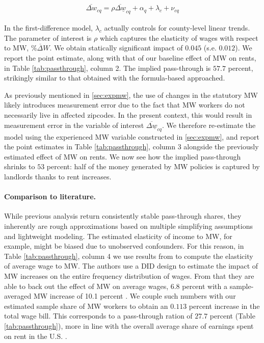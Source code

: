\begin{align}
	\overline{\Delta w}_{cq} = \rho \overline{\Delta \underline{w}}_{cq} + \alpha_{q} + \lambda_{c} + \nu_{cq}
\end{align}

In the first-difference model, $\lambda_{c}$ actually controls for county-level linear trends. 
The parameter of interest is $\rho$ which captures the elasticity of wages with respect to 
MW, $\overline{\% \Delta W}$. We obtain statically significant impact of $0.045$ (s.e. $0.012$). 
We report the point estimate, along with that of our baseline effect of MW on rents, in 
Table \ref{tab:passthrough}, column 2. The implied pass-through is $57.7$ percent, 
strikingly similar to that obtained with the formula-based approached. 

As previously mentioned in \autoref{sec:expmw}, the use of changes in the statutory 
MW likely introduces measurement error due to the fact that MW workers do not necessarily 
live in affected zipcodes. In the present context, this would result in measurement error in 
the variable of interest $\overline{\Delta \underline{w}}_{cq}$. We therefore re-estimate the model 
using the experienced MW variable constructed in \autoref{sec:expmw}, and report the point 
estimates in Table \ref{tab:passthrough}, column 3 alongside the previously estimated effect 
of MW on rents. We now see how the implied pass-through shrinks to $53$ percent: half of 
the money generated by MW policies is captured by landlords thanks to rent increases. \\

\paragraph{Comparison to literature.} While previous analysis return consistently stable 
pass-through shares, they inherently are rough approximations based on multiple simplifying 
assumptions and lightweight modeling. The estimated elasticity of income to MW, for example, 
might be biased due to unobserved confounders. For this reason, in Table \ref{tab:passthrough}, 
column 4 we use results from \textcite{cengiz2019effect} to compute the elasticity of 
average wage to MW. The authors use a DID design to estimate the impact of MW increases 
on the entire frequency distribution of wages. From that they are able to back out the effect of 
MW on average wages, 6.8 percent with a sample-averaged MW increase of 10.1 percent 
\parencite[Table I]{cengiz2019effect}. We couple such numbers with our estimated sample share 
of MW workers to obtain an $0.113$ percent increase in the total wage bill. This corresponds to 
a pass-through ration of $27.7$ percent (Table \ref{tab:passthrough}), more in line with the 
overall average share of earnings spent on rent in the U.S. \parencite{fernald2020americas}.   

